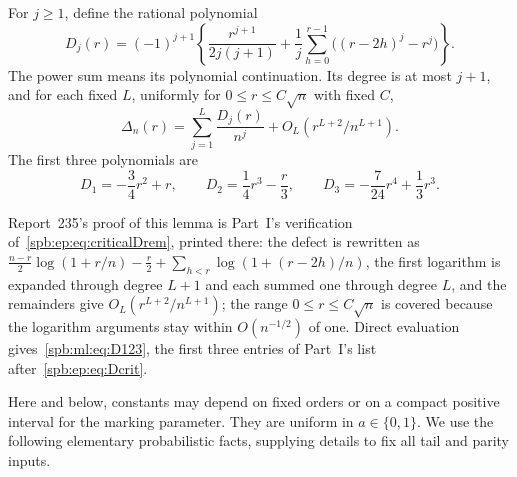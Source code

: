 \begin{lemma}\label{spb:ml:lem:defects}
For $j\ge1$, define the rational polynomial
\begin{equation}\label{spb:ml:eq:Dj}
D_j(r)=(-1)^{j+1}\left\{\frac{r^{j+1}}{2j(j+1)}
 +\frac1j\sum_{h=0}^{r-1}\bigl((r-2h)^j-r^j\bigr)\right\}.
\end{equation}
The power sum means its polynomial continuation. Its degree is at most $j+1$, and for each fixed $L$, uniformly for $0\le r\le C\sqrt n$ with fixed $C$,
\begin{equation}\label{spb:ml:eq:defectremainder}
\Delta_n(r)=\sum_{j=1}^L\frac{D_j(r)}{n^j}
 +O_L(r^{L+2}/n^{L+1}).
\end{equation}
The first three polynomials are
\begin{equation}\label{spb:ml:eq:D123}
 D_1=-\frac34r^2+r,\qquad D_2=\frac14r^3-\frac r3,
 \qquad D_3=-\frac7{24}r^4+\frac13r^3.
\end{equation}
\end{lemma}
\begin{writenote}
Report~235's proof of this lemma is Part~I's verification
of~\eqref{spb:ep:eq:criticalDrem}, printed there: the defect is rewritten as
$\frac{n-r}2\log(1+r/n)-\frac r2+\sum_{h<r}\log(1+(r-2h)/n)$, the first
logarithm is expanded through degree $L+1$ and each summed one through degree
$L$, and the remainders give $O_L(r^{L+2}/n^{L+1})$; the range
$0\le r\le C\sqrt n$ is covered because the logarithm arguments stay within
$O(n^{-1/2})$ of one. Direct evaluation gives~\eqref{spb:ml:eq:D123}, the
first three entries of Part~I's list after~\eqref{spb:ep:eq:Dcrit}.
\end{writenote}

Here and below, constants may depend on fixed orders or on a compact positive interval for the marking parameter. They are uniform in $a\in\{0,1\}$. We use the following elementary probabilistic facts, supplying details to fix all tail and parity inputs.

